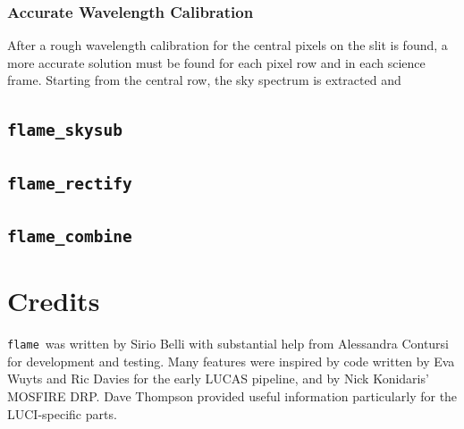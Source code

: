 \documentclass[a4paper, notitlepage]{article}
\newcommand{\flame}{\texttt{flame}}
\begin{document}
\subsubsection{Accurate Wavelength Calibration}

After a rough wavelength calibration for the central pixels on the slit is found, a more accurate solution must be found for each pixel row and in each science frame. Starting from the central row, the sky spectrum is extracted and



\subsection{\texttt{flame\_skysub}}




\subsection{\texttt{flame\_rectify}}




\subsection{\texttt{flame\_combine}}





\vspace{10mm}

\section*{Credits}

\flame\ was written by Sirio Belli with substantial help from Alessandra Contursi for development and testing. Many features were inspired by code written by Eva Wuyts and Ric Davies for the early LUCAS pipeline, and by Nick Konidaris' MOSFIRE DRP. Dave Thompson provided useful information particularly for the LUCI-specific parts.
\end{document}
